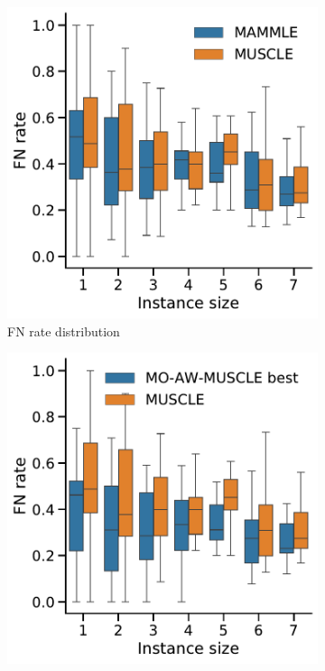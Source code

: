 \begin{figure}[!htbp]%
	\begin{adjustwidth}{-1.2cm}{}
		\centering
		\begin{subfigure}{0.40\textwidth} \includegraphics[width=\textwidth]{Figure/comparison-ast} \caption{FN rate distribution} \label{fig:boxplot-ast} \end{subfigure}
		\begin{subfigure}{0.40\textwidth} \includegraphics[width=\textwidth]{Figure/comparison-momuscle} 

\end{subfigure}
\end{adjustwidth}
\end{figure}
